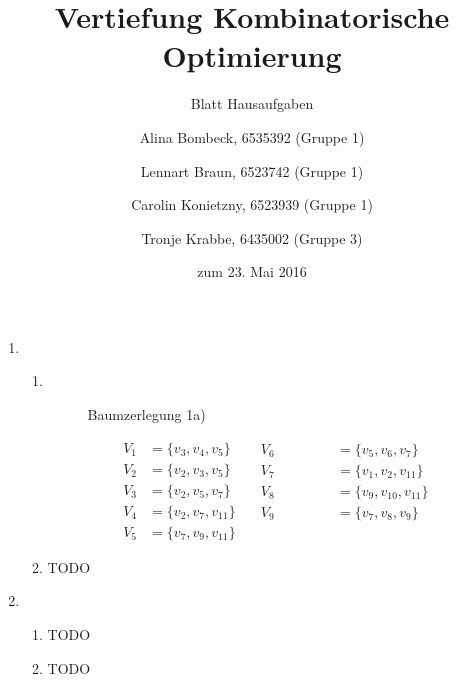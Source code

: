 \documentclass[a4paper]{scrartcl}
\title{Vertiefung Kombinatorische Optimierung}
\subtitle{Blatt {\blattnr} Hausaufgaben}
\author{%
    Alina Bombeck, 6535392 (Gruppe 1) \and
    Lennart Braun, 6523742 (Gruppe 1) \and
    Carolin Konietzny, 6523939 (Gruppe 1) \and
    Tronje Krabbe, 6435002 (Gruppe 3)
}
\date{zum 23. Mai 2016}
\begin{document}
\maketitle


\begin{enumerate}[label=\bfseries \arabic*.]
\item %
\begin{enumerate}
    \item %
        \hfill \\
        \begin{figure}[H]
        \centering
        \caption{Baumzerlegung 1a)}
        \end{figure}

        \begin{equation}
        \begin{aligned}
            V_1 &= \{v_3, v_4, v_5 \} \\
            V_2 &= \{v_2, v_3, v_5 \} \\
            V_3 &= \{v_2, v_5, v_7\} \\
            V_4 &= \{v_2, v_7, v_{11}\} \\
            V_5 &= \{v_7, v_9, v_{11}\}
        \end{aligned}
        \quad
        \begin{aligned}
            V_6 &= \{v_5, v_6, v_7\} \\
            V_7 &= \{v_1, v_2, v_{11}\} \\
            V_8 &= \{v_9, v_{10}, v_{11}\} \\
            V_9 &= \{v_7, v_8, v_9\} \\
            \phantom{irgendwas}
        \end{aligned}
        \end{equation}
        
    \item %
        TODO
\end{enumerate}

\item %
\begin{enumerate}
    \item %
        TODO
    \item %
        TODO
\end{enumerate}

\end{enumerate}
\end{document}
